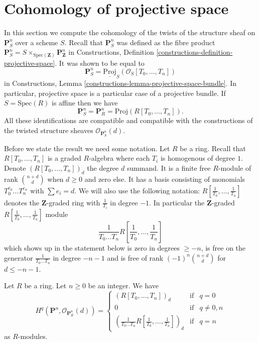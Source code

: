 \section{Cohomology of projective space}
\label{section-cohomology-projective-space}

\noindent
In this section we compute the cohomology of the twists of the
structure sheaf on $\mathbf{P}^n_S$ over a scheme $S$.
Recall that $\mathbf{P}^n_S$ was defined as the fibre product
$
\mathbf{P}^n_S = S \times_{\text{Spec}(\mathbf{Z})} \mathbf{P}^n_{\mathbf{Z}}
$
in Constructions, Definition \ref{constructions-definition-projective-space}.
It was shown to be equal to
$$
\mathbf{P}^n_S = \underline{\text{Proj}}_S(\mathcal{O}_S[T_0, \ldots, T_n])
$$
in Constructions, Lemma \ref{constructions-lemma-projective-space-bundle}.
In particular, projective space is a particular case of a projective bundle.
If $S = \text{Spec}(R)$ is affine then we have
$$
\mathbf{P}^n_S = \mathbf{P}^n_R = \text{Proj}(R[T_0, \ldots, T_n]).
$$
All these identifications are compatible and compatible with the constructions
of the twisted structure sheaves $\mathcal{O}_{\mathbf{P}^n_S}(d)$.

\medskip\noindent
Before we state the result we need some notation.
Let $R$ be a ring.
Recall that $R[T_0, \ldots, T_n]$ is a graded
$R$-algebra where each $T_i$ is homogenous of degree $1$.
Denote $(R[T_0, \ldots, T_n])_d$ the degree $d$ summand.
It is a finite free $R$-module of rank $\binom{n + d}{d}$
when $d \geq 0$ and zero else.
It has a basis consisting of monomials $T_0^{e_0} \ldots T_n^{e_n}$
with $\sum e_i = d$. We will also use the following notation:
$R[\frac{1}{T_0}, \ldots, \frac{1}{T_n}]$ denotes the $\mathbf{Z}$-graded
ring with $\frac{1}{T_i}$ in degree $-1$. In particular the
$\mathbf{Z}$-graded $R[\frac{1}{T_0}, \ldots, \frac{1}{T_n}]$ module
$$
\frac{1}{T_0 \ldots T_n} R[\frac{1}{T_0}, \ldots, \frac{1}{T_n}]
$$
which shows up in the statement below is zero in degrees
$\geq -n$, is free on the generator $\frac{1}{T_0 \ldots T_n}$
in degree $-n - 1$ and is free of rank $(-1)^n\binom{n + d}{d}$ for
$d \leq -n - 1$.

\begin{lemma}
\label{lemma-cohomology-projective-space-over-ring}
Let $R$ be a ring.
Let $n \geq 0$ be an integer.
We have
$$
H^q(\mathbf{P}^n, \mathcal{O}_{\mathbf{P}^n_R}(d)) =
\left\{
\begin{matrix}
(R[T_0, \ldots, T_n])_d & \text{if} & q = 0 \\
0 & \text{if} & q \not = 0, n \\
\left(\frac{1}{T_0 \ldots T_n} R[\frac{1}{T_0}, \ldots, \frac{1}{T_n}]\right)_d
& \text{if} & q = n
\end{matrix}
\right.
$$
as $R$-modules.
\end{lemma}

